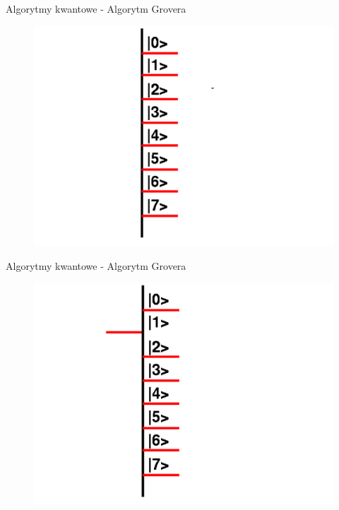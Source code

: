 \documentclass{beamer}
\begin{document}
	
	\begin{frame}{Algorytmy kwantowe - Algorytm Grovera}
			\vspace{0.5em}
			\begin{center}
				\begin{figure}
					\includegraphics[scale=0.35]{media/visualization1.png}
				\end{figure}
			\end{center}
			\vspace{0.5em}
	\end{frame}
	
	\begin{frame}{Algorytmy kwantowe - Algorytm Grovera}
		\vspace{0.5em}
		\begin{center}
			\begin{figure}
				\includegraphics[scale=0.35]{media/visualization2.png}
			\end{figure}
		\end{center}
		\vspace{0.5em}
	\end{frame}
		
\end{document}
